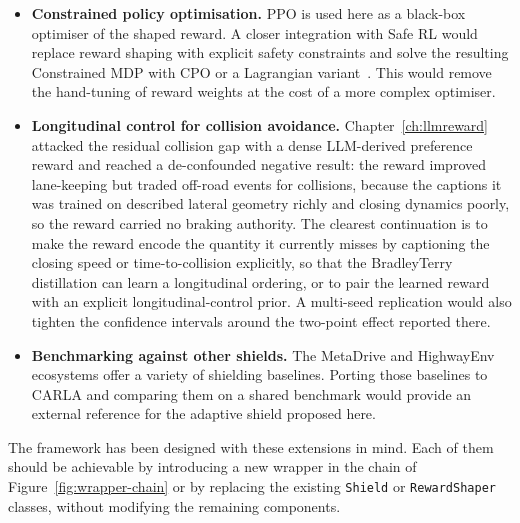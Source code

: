\begin{itemize}
        composing their individual shields into a global safety filter is an open research
        direction at the intersection of Safe RL and multi-agent RL.
  \item \textbf{Constrained policy optimisation.} PPO is used here as a black-box optimiser of
        the shaped reward. A closer integration with Safe RL would replace reward shaping
        with explicit safety constraints and solve the resulting Constrained MDP with CPO or a
        Lagrangian variant~\cite{achiam2017cpo,stooke2020responsive}. This would remove the
        hand-tuning of reward weights at the cost of a more complex optimiser.
  \item \textbf{Longitudinal control for collision avoidance.} Chapter~\ref{ch:llmreward} attacked
        the residual collision gap with a dense LLM-derived preference reward and reached a
        de-confounded negative result: the reward improved lane-keeping but traded off-road events
        for collisions, because the captions it was trained on described lateral geometry richly
        and closing dynamics poorly, so the reward carried no braking authority. The clearest
        continuation is to make the reward encode the quantity it currently misses by captioning
        the closing speed or time-to-collision explicitly, so that the
        Bradley\textendash Terry distillation can learn a longitudinal ordering, or to pair the
        learned reward with an explicit longitudinal-control prior. A multi-seed replication would
        also tighten the confidence intervals around the two-point effect reported there.
  \item \textbf{Benchmarking against other shields.} The MetaDrive and HighwayEnv ecosystems
        offer a variety of shielding baselines. Porting those baselines to CARLA and comparing
        them on a shared benchmark would provide an external reference for the adaptive shield
        proposed here.
\end{itemize}

The framework has been designed with these extensions in mind. Each of them should be achievable
by introducing a new wrapper in the chain of Figure~\ref{fig:wrapper-chain} or by replacing the
existing \texttt{Shield} or \texttt{RewardShaper} classes, without modifying the remaining
components.

\clearpage

